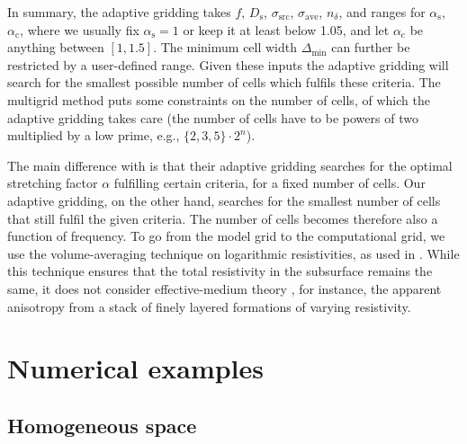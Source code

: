 \documentclass[
    manuscript,
    revised,
  ]{geophysics}
\newcommand{\mr}[1]{\mathrm{#1}}
\newcommand{\emg}[2]{\texttt{emg#1#2}\xspace}
\begin{document}
In summary, the adaptive gridding takes $f$, $D_\mr{s}$, $\sigma_\mr{src}$,
$\sigma_\mr{ave}$, $n_\delta$, and ranges for $\alpha_\mr{s}$, $\alpha_\mr{c}$,
where we usually fix $\alpha_\mr{s}=1$ or keep it at least below 1.05, and let
$\alpha_\mr{c}$ be anything between $[1, 1.5]$. The minimum cell width
$\Delta_\mr{min}$ can further be restricted by a user-defined range. Given
these inputs the adaptive gridding will search for the smallest possible number
of cells which fulfils these criteria. The  multigrid method
\old{implemented in \emg3d} puts some constraints on the number of cells, of
which the adaptive gridding takes care (the number of cells have to be powers
of two multiplied by a low prime, e.g., $\{2,3,5\}\cdot2^n$).

The main difference with \cite{GEO.08.Mulder} is that their adaptive gridding
searches for the optimal stretching factor $\alpha$ fulfilling certain
criteria, for a fixed number of cells. Our adaptive gridding, on the other
hand, searches for the smallest number of cells that still fulfil the given
criteria. The number of cells becomes therefore also a function of frequency.
To go from the model grid to the computational grid, we use the
volume-averaging technique on logarithmic resistivities, as used in
\cite{GEO.07.Plessix}. While this technique ensures that the total resistivity
in the subsurface remains the same, it does not consider effective-medium
theory \citep{GEO.03.Davydycheva}, for instance, the apparent anisotropy from a
stack of finely layered formations of varying resistivity.

\section{Numerical examples}

\subsection{Homogeneous space}
\end{document}
